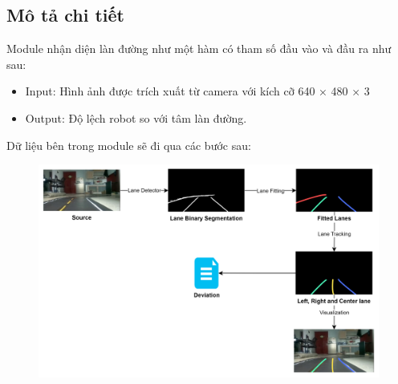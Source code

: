 \subsection{Mô tả chi tiết}
Module nhận diện làn đường như một hàm có tham số đầu vào và đầu ra như sau:
\begin{itemize}
    \item Input: Hình ảnh được trích xuất từ camera với kích cỡ 640 × 480 × 3
    \item Output: Độ lệch robot so với tâm làn đường.
\end{itemize}
Dữ liệu bên trong module sẽ đi qua các bước sau:
\newpage
\begin{figure}[!hbt]
    \centering
    \includegraphics[width=15cm]{img/3_Architecture/lane_detector_arch.png}
\end{figure}



